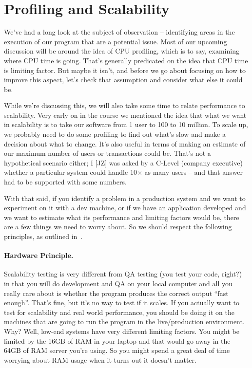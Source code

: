 




\section*{Profiling and Scalability}

We've had a long look at the subject of observation -- identifying areas in the execution of our program that are a potential issue. Most of our upcoming discussion will be around the idea of CPU profiling, which is to say, examining where CPU time is going. That's generally predicated on the idea that CPU time is limiting factor. But maybe it isn't, and before we go about focusing on how to improve this aspect, let's check that assumption and consider what else it could be.

While we're discussing this, we will also take some time to relate performance to scalability. Very early on in the course we mentioned the idea that what we want in scalability is to take our software from 1 user to 100 to 10 million. To scale up, we probably need to do some profiling to find out what's slow and make a decision about what to change. It's also useful in terms of making an estimate of our maximum number of users or transactions could be. That's not a hypothetical scenario either; I [JZ] was asked by a C-Level (company executive) whether a particular system could handle 10$\times$ as many users -- and that answer had to be supported with some numbers.

With that said, if you identify a problem in a production system and we want to experiment on it with a dev machine, or if we have an application developed and we want to estimate what its performance and limiting factors would be, there are a few things we need to worry about.  So we should respect the following principles, as outlined in~\cite{swps}.

\paragraph{Hardware Principle.} 
Scalability testing is very different from  QA testing (you test your code, right?) in that you will do development and QA on your local computer and all you really care about is whether the program produces the correct output ``fast enough''. That's fine, but it's no way to test if it scales. If you actually want to test for scalability and real world performance, you should be doing it on the machines that are going to run the program in the live/production environment. Why? Well, low-end systems have very different limiting factors. You might be limited by the 16GB of RAM in your laptop and that would go away in the 64GB of RAM server you're using. So you might spend a great deal of time worrying about RAM usage when it turns out it doesn't matter.

